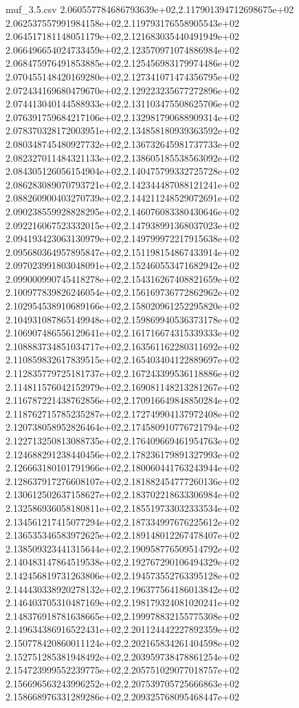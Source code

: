 \begin{filecontents*}{muf_3.5.csv}
2.060557784686793639e+02,2.117901394712698675e+02
2.062537557991984158e+02,2.119793176558905543e+02
2.064517181148051179e+02,2.121683035440491949e+02
2.066496654024733459e+02,2.123570971074886984e+02
2.068475976491853885e+02,2.125456983179974486e+02
2.070455148420169280e+02,2.127341071474356795e+02
2.072434169680479670e+02,2.129223235677272896e+02
2.074413040144588933e+02,2.131103475508625706e+02
2.076391759684217106e+02,2.132981790688909314e+02
2.078370328172003951e+02,2.134858180939363592e+02
2.080348745480927732e+02,2.136732645981737733e+02
2.082327011484321133e+02,2.138605185538563092e+02
2.084305126056154904e+02,2.140475799332725728e+02
2.086283089070793721e+02,2.142344487088121241e+02
2.088260900403270739e+02,2.144211248529072691e+02
2.090238559928828295e+02,2.146076083380430646e+02
2.092216067523332015e+02,2.147938991368037023e+02
2.094193423063130979e+02,2.149799972217915638e+02
2.095680364957895847e+02,2.151198154867433914e+02
2.097023991803048091e+02,2.152460553471682942e+02
2.099000990745418278e+02,2.154316267408821659e+02
2.100977839826246054e+02,2.156169736772862962e+02
2.102954538910689166e+02,2.158020961252295820e+02
2.104931087865149948e+02,2.159869940536373178e+02
2.106907486556129641e+02,2.161716674315339333e+02
2.108883734851034717e+02,2.163561162280311692e+02
2.110859832617839515e+02,2.165403404122889697e+02
2.112835779725181737e+02,2.167243399536118886e+02
2.114811576042152979e+02,2.169081148213281267e+02
2.116787221438762856e+02,2.170916649848850284e+02
2.118762715785235287e+02,2.172749904137972408e+02
2.120738058952826464e+02,2.174580910776721794e+02
2.122713250813088735e+02,2.176409669461954763e+02
2.124688291238440456e+02,2.178236179891327993e+02
2.126663180101791966e+02,2.180060441763243944e+02
2.128637917276608107e+02,2.181882454777260136e+02
2.130612502637158627e+02,2.183702218633306984e+02
2.132586936058180811e+02,2.185519733032333534e+02
2.134561217415077294e+02,2.187334997676225612e+02
2.136535346583972625e+02,2.189148012267478407e+02
2.138509323441315644e+02,2.190958776509514792e+02
2.140483147864519538e+02,2.192767290106494329e+02
2.142456819731263806e+02,2.194573552763395128e+02
2.144430338920278132e+02,2.196377564186013842e+02
2.146403705310487169e+02,2.198179324081020241e+02
2.148376918781638665e+02,2.199978832155775308e+02
2.149634386916522431e+02,2.201124442227892359e+02
2.150778420860011124e+02,2.202165834261404598e+02
2.152751285381948492e+02,2.203959738478861254e+02
2.154723999552239775e+02,2.205751029077018757e+02
2.156696563243996252e+02,2.207539705725666863e+02
2.158668976331289286e+02,2.209325768095468447e+02

\end{filecontents*}
